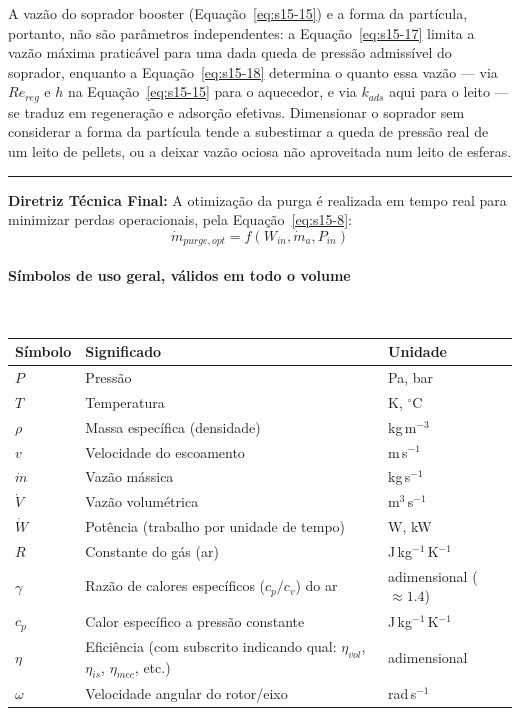 \documentclass[12pt,a4paper]{article}
\numberwithin{equation}{section}
\numberwithin{table}{section}
\numberwithin{figure}{section}
\begin{document}
		A vazão do soprador booster (Equação~\eqref{eq:s15-15}) e a forma da partícula, portanto, não são parâmetros independentes: a Equação~\eqref{eq:s15-17} limita a vazão máxima praticável para uma dada queda de pressão admissível do soprador, enquanto a Equação~\eqref{eq:s15-18} determina o quanto essa vazão — via $Re_{reg}$ e $h$ na Equação~\eqref{eq:s15-15} para o aquecedor, e via $k_{ads}$ aqui para o leito — se traduz em regeneração e adsorção efetivas. Dimensionar o soprador sem considerar a forma da partícula tende a subestimar a queda de pressão real de um leito de pellets, ou a deixar vazão ociosa não aproveitada num leito de esferas.

		\vspace{1em}
		\hrule
		\vspace{1em}

		\textbf{Diretriz Técnica Final:} A otimização da purga é realizada em tempo real para minimizar perdas operacionais, pela Equação~\eqref{eq:s15-8}:
		\begin{equation}\label{eq:s15-8}
\boxed{\dot{m}_{purge,opt} = f(W_{in}, \dot{m}_a, P_{in})}
\end{equation}
	
	
\paragraph{Símbolos de uso geral, válidos em todo o volume}\mbox{}\\[-0.5em]
{\small
\begin{longtable}{>{\raggedright\arraybackslash}p{2.6cm} >{\raggedright\arraybackslash}p{9.2cm} >{\raggedright\arraybackslash}p{2.6cm}}
	\toprule
	\textbf{Símbolo} & \textbf{Significado} & \textbf{Unidade} \\ \midrule
	\endhead
	$P$ & Pressão & Pa, bar \\
	$T$ & Temperatura & K, $^{\circ}$C \\
	$\rho$ & Massa específica (densidade) & kg\,m$^{-3}$ \\
	$v$ & Velocidade do escoamento & m\,s$^{-1}$ \\
	$\dot{m}$ & Vazão mássica & kg\,s$^{-1}$ \\
	$\dot{V}$ & Vazão volumétrica & m$^3$\,s$^{-1}$ \\
	$\dot{W}$ & Potência (trabalho por unidade de tempo) & W, kW \\
	$R$ & Constante do gás (ar) & J\,kg$^{-1}$\,K$^{-1}$ \\
	$\gamma$ & Razão de calores específicos ($c_p/c_v$) do ar & adimensional ($\approx 1.4$) \\
	$c_p$ & Calor específico a pressão constante & J\,kg$^{-1}$\,K$^{-1}$ \\
	$\eta$ & Eficiência (com subscrito indicando qual: $\eta_{vol}$, $\eta_{is}$, $\eta_{mec}$, etc.) & adimensional \\
	$\omega$ & Velocidade angular do rotor/eixo & rad\,s$^{-1}$ \\
	\bottomrule
\end{longtable}
}
\clearpage
\end{document}
